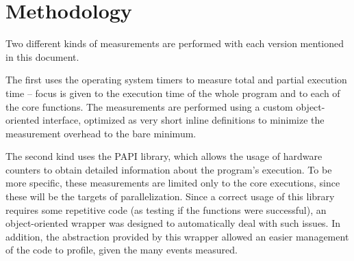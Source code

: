 \documentclass[abstract=on,9pt,twocolumn]{scrartcl}
\begin{document}
\section{Methodology}
\label{sec:method}
Two different kinds of measurements are performed with each version mentioned in this document. 

The first uses the operating system timers to measure total and partial execution time -- focus is given to the execution time of the whole program and to each of the core functions. The measurements are performed using a custom object-oriented interface, optimized as very short inline definitions to minimize the measurement overhead to the bare minimum.

The second kind uses the PAPI library, which allows the usage of hardware counters to obtain detailed information about the program's execution. To be more specific, these measurements are limited only to the core executions, since these will be the targets of parallelization. Since a correct usage of this library requires some repetitive code (as testing if the functions were successful), an object-oriented wrapper was designed to automatically deal with such issues. In addition, the abstraction provided by this wrapper allowed an easier management of the code to profile, given the many events measured.
\end{document}
